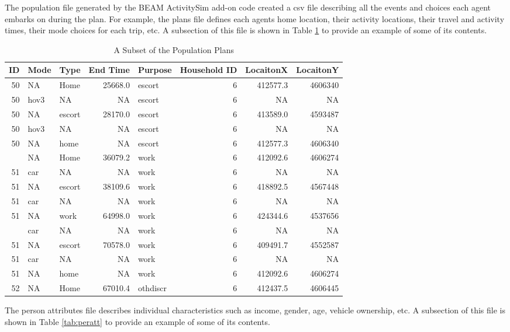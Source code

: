 \documentclass[12pt, oneside, openright]{byuthesis}
\begin{document}
The population file generated by the BEAM ActivitySim add-on code created a csv file describing all the events and choices each agent embarks on during the plan. For example, the plans file defines each agents home location, their activity locations, their travel and activity times, their mode choices for each trip, etc. A subsection of this file is shown in Table \ref{tab:plans} to provide an example of some of its contents.

\begin{table}

\caption{\label{tab:plans}A Subset of the Population Plans}
\centering
\begin{tabular}[t]{rllrlrrr}
\toprule
ID & Mode & Type & End Time & Purpose & Household ID & LocaitonX & LocaitonY\\
\midrule
50 & NA & Home & 25668.0 & escort & 6 & 412577.3 & 4606340\\
50 & hov3 & NA & NA & escort & 6 & NA & NA\\
50 & NA & escort & 28170.0 & escort & 6 & 413589.0 & 4593487\\
50 & hov3 & NA & NA & escort & 6 & NA & NA\\
50 & NA & home & NA & escort & 6 & 412577.3 & 4606340\\
\addlinespace
51 & NA & Home & 36079.2 & work & 6 & 412092.6 & 4606274\\
51 & car & NA & NA & work & 6 & NA & NA\\
51 & NA & escort & 38109.6 & work & 6 & 418892.5 & 4567448\\
51 & car & NA & NA & work & 6 & NA & NA\\
51 & NA & work & 64998.0 & work & 6 & 424344.6 & 4537656\\
\addlinespace
51 & car & NA & NA & work & 6 & NA & NA\\
51 & NA & escort & 70578.0 & work & 6 & 409491.7 & 4552587\\
51 & car & NA & NA & work & 6 & NA & NA\\
51 & NA & home & NA & work & 6 & 412092.6 & 4606274\\
52 & NA & Home & 67010.4 & othdiscr & 6 & 412437.5 & 4606445\\
\bottomrule
\end{tabular}
\end{table}

The person attributes file describes individual characteristics such as income, gender, age, vehicle ownership, etc. A subsection of this file is shown in Table \ref{tab:peratt} to provide an example of some of its contents.
\end{document}
